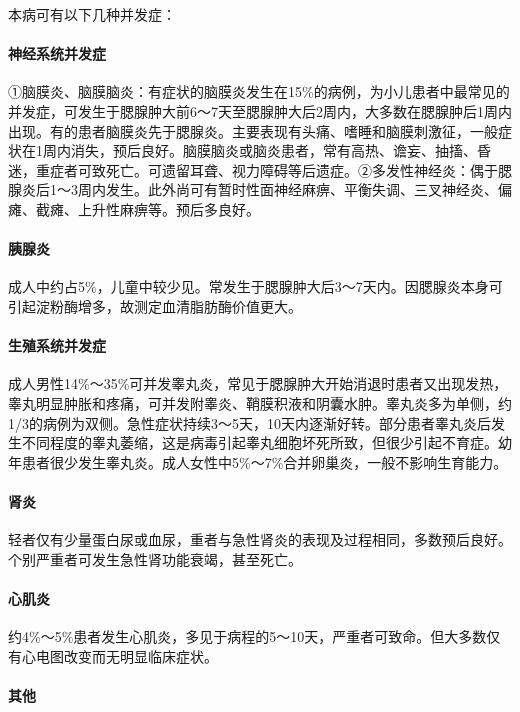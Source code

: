 本病可有以下几种并发症：

\paragraph{神经系统并发症}

①脑膜炎、脑膜脑炎：有症状的脑膜炎发生在15\%的病例，为小儿患者中最常见的并发症，可发生于腮腺肿大前6～7天至腮腺肿大后2周内，大多数在腮腺肿后1周内出现。有的患者脑膜炎先于腮腺炎。主要表现有头痛、嗜睡和脑膜刺激征，一般症状在1周内消失，预后良好。脑膜脑炎或脑炎患者，常有高热、谵妄、抽搐、昏迷，重症者可致死亡。可遗留耳聋、视力障碍等后遗症。②多发性神经炎：偶于腮腺炎后1～3周内发生。此外尚可有暂时性面神经麻痹、平衡失调、三叉神经炎、偏瘫、截瘫、上升性麻痹等。预后多良好。

\paragraph{胰腺炎}

成人中约占5\%，儿童中较少见。常发生于腮腺肿大后3～7天内。因腮腺炎本身可引起淀粉酶增多，故测定血清脂肪酶价值更大。

\paragraph{生殖系统并发症}

成人男性14\%～35\%可并发睾丸炎，常见于腮腺肿大开始消退时患者又出现发热，睾丸明显肿胀和疼痛，可并发附睾炎、鞘膜积液和阴囊水肿。睾丸炎多为单侧，约1/3的病例为双侧。急性症状持续3～5天，10天内逐渐好转。部分患者睾丸炎后发生不同程度的睾丸萎缩，这是病毒引起睾丸细胞坏死所致，但很少引起不育症。幼年患者很少发生睾丸炎。成人女性中5\%～7\%合并卵巢炎，一般不影响生育能力。

\paragraph{肾炎}

轻者仅有少量蛋白尿或血尿，重者与急性肾炎的表现及过程相同，多数预后良好。个别严重者可发生急性肾功能衰竭，甚至死亡。

\paragraph{心肌炎}

约4\%～5\%患者发生心肌炎，多见于病程的5～10天，严重者可致命。但大多数仅有心电图改变而无明显临床症状。

\paragraph{其他}

